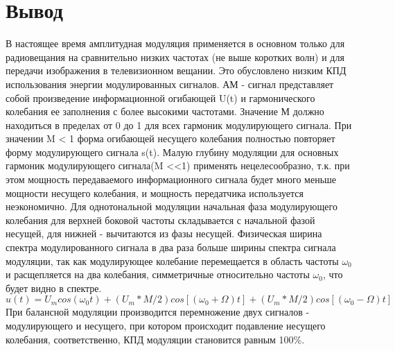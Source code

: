 \section{Вывод}
В настоящее время амплитудная модуляция применяется в основном только для радиовещания на сравнительно низких частотах (не выше коротких волн) и для передачи изображения в телевизионном вещании. Это обусловлено низким КПД использования энергии модулированных сигналов. АМ - сигнал представляет собой произведение информационной огибающей U(t)
и гармонического колебания ее заполнения с более высокими частотами.
Значение М должно находиться в пределах от 0 до 1 для всех гармоник модулирующего сигнала. При значении M < 1 форма огибающей несущего колебания полностью повторяет форму модулирующего сигнала s(t). Малую
глубину модуляции для основных гармоник модулирующего сигнала(M <<1) применять нецелесообразно, т.к. при этом мощность передаваемого информационного сигнала будет много меньше мощности несущего колебания,
и мощность передатчика используется неэкономично. Для однотональной
модуляции начальная фаза модулирующего колебания для верхней боковой частоты складывается с начальной фазой несущей, для нижней - вычитаются из фазы несущей. Физическая ширина спектра модулированного
сигнала в два раза больше ширины спектра сигнала модуляции, так как
модулирующее колебание перемещается в область частоты $\omega_0$ и расщепляется на два колебания, симметричные относительно частоты $\omega_0$, что будет видно в спектре.
$$ u(t) = U_m cos(\omega_0 t) + (U_m * M/2)cos[(\omega_0 + \Omega)t] + (U_m * M/2)cos[(\omega_0 - \Omega)t] $$
При балансной модуляции производится перемножение двух сигналов - модулирующего и несущего, при котором происходит подавление несущего колебания, соответственно, КПД модуляции становится равным 100\%.
